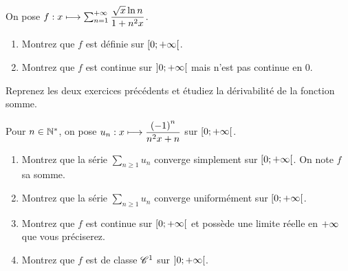 \begin{exoss}~\\
On pose \(f:x\longmapsto\sum_{n=1}^{+\infty}\dfrac{\sqrt{x}\ln n}{1+n^2x}\).

\begin{enumerate}
    \item Montrez que \(f\) est définie sur \(\left[0;+\infty\right[\). \\
    \item Montrez que \(f\) est continue sur \(\left]0;+\infty\right[\) mais n'est pas continue en \(0\).
\end{enumerate}
\end{exoss}

\begin{exoss}
Reprenez les deux exercices précédents et étudiez la dérivabilité de la fonction somme.
\end{exoss}

\begin{exoss}
Pour \(n\in\mathbb{N}^*\), on pose \(u_n:x\longmapsto\dfrac{\left(-1\right)^n}{n^2x+n}\) sur \(\left[0;+\infty\right[\).

\begin{enumerate}
    \item Montrez que la série \(\sum_{n\geq1}u_n\) converge simplement sur \(\left[0;+\infty\right[\). On note \(f\) sa somme. \\
    \item Montrez que la série \(\sum_{n\geq1}u_n\) converge uniformément sur \(\left[0;+\infty\right[\). \\
    \item Montrez que \(f\) est continue sur \(\left[0;+\infty\right[\) et possède une limite réelle en \(+\infty\) que vous préciserez. \\
    \item Montrez que \(f\) est de classe \(\mathscr{C}^{1}\) sur \(\left]0;+\infty\right[\).
\end{enumerate}
\end{exoss}

